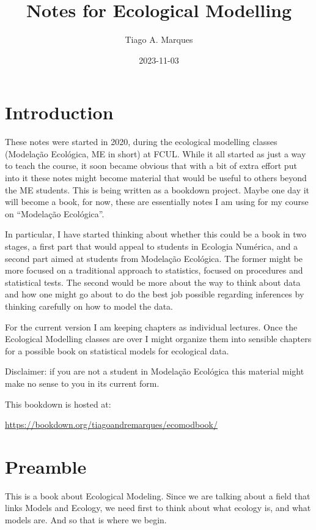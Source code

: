 \documentclass[
]{book}
\title{Notes for Ecological Modelling}
\author{Tiago A. Marques}
\date{2023-11-03}
\begin{document}
\maketitle

{
\setcounter{tocdepth}{1}
\tableofcontents
}
\hypertarget{introduction}{%
\chapter{Introduction}\label{introduction}}

These notes were started in 2020, during the ecological modelling classes (Modelação Ecológica, ME in short) at FCUL. While it all started as just a way to teach the course, it soon became obvious that with a bit of extra effort put into it these notes might become material that would be useful to others beyond the ME students. This is being written as a bookdown project. Maybe one day it will become a book, for now, these are essentially notes I am using for my course on ``Modelação Ecológica''.

In particular, I have started thinking about whether this could be a book in two stages, a first part that would appeal to students in Ecologia Numérica, and a second part aimed at students from Modelação Ecológica. The former might be more focused on a traditional approach to statistics, focused on procedures and statistical tests. The second would be more about the way to think about data and how one might go about to do the best job possible regarding inferences by thinking carefully on how to model the data.

For the current version I am keeping chapters as individual lectures. Once the Ecological Modelling classes are over I might organize them into sensible chapters for a possible book on statistical models for ecological data.

Disclaimer: if you are not a student in Modelação Ecológica this material might make no sense to you in its current form.

This bookdown is hosted at:

\url{https://bookdown.org/tiagoandremarques/ecomodbook/}

\hypertarget{mainintro}{%
\chapter{Preamble}\label{mainintro}}

This is a book about Ecological Modeling. Since we are talking about a field that links Models and Ecology, we need first to think about what ecology is, and what models are. And so that is where we begin.
\end{document}

